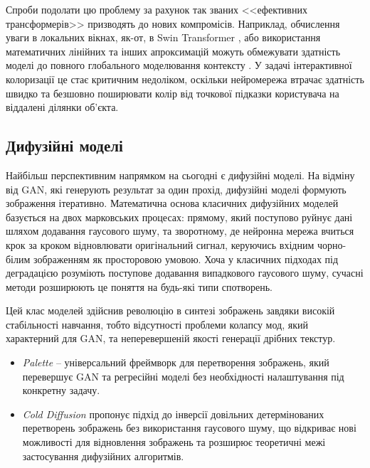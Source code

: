             Спроби подолати цю проблему за рахунок так званих <<ефективних трансформерів>> призводять до нових компромісів.
            Наприклад, обчислення уваги в локальних вікнах, як-от, в Swin Transformer \cite{2021-swin-transformer},
            або використання математичних лінійних та інших апроксимацій можуть обмежувати здатність моделі до повного глобального моделювання контексту \cite{2021-long-range-arena, 2022-efficient-transformers-survey}.
            У задачі інтерактивної колоризації це стає критичним недоліком, оскільки нейромережа втрачає здатність швидко та безшовно поширювати колір від точкової підказки користувача на віддалені ділянки об'єкта.
            
        \subsection{Дифузійні моделі}
            Найбільш перспективним напрямком на сьогодні є дифузійні моделі.
            На відміну від GAN, які генерують результат за один прохід, дифузійні моделі формують зображення ітеративно.
            Математична основа класичних дифузійних моделей базується на двох марковських процесах:
            прямому, який поступово руйнує дані шляхом додавання гаусового шуму,
            та зворотному, де нейронна мережа вчиться крок за кроком відновлювати оригінальний сигнал,
            керуючись вхідним чорно-білим зображенням як просторовою умовою.
            Хоча у класичних підходах під деградацією розуміють поступове додавання випадкового гаусового шуму,
            сучасні методи розширюють це поняття на будь-які типи спотворень.

            Цей клас моделей здійснив революцію в синтезі зображень завдяки високій стабільності навчання,
            тобто відсутності проблеми колапсу мод, який характерний для GAN, та неперевершеній якості генерації дрібних текстур.
            
            \begin{itemize}[label=$\bullet$]
                \item \textit{Palette} \cite{2022-palette-image-to-image-diffusion-models} -- універсальний фреймворк для перетворення зображень, який перевершує GAN та регресійні моделі без необхідності налаштування під конкретну задачу.
                \item \textit{Cold Diffusion} \cite{2023-cold-diffusion} пропонує підхід до інверсії довільних детермінованих перетворень зображень без використання гаусового шуму, що відкриває нові можливості для відновлення зображень та розширює теоретичні межі застосування дифузійних алгоритмів.
            \end{itemize}

